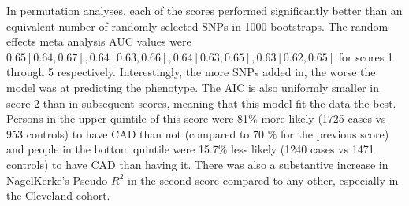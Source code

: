 In permutation analyses, each of the scores performed significantly better than an equivalent number of randomly selected \acp{SNP} in 1000 bootstraps. The random effects meta analysis \ac{AUC} values were $0.65 [ 0.64, 0.67], 0.64[0.63, 0.66], 0.64[0.63, 0.65], 0.63[0.62, 0.65]$ for scores 1 through 5 respectively. Interestingly, the more \acp{SNP} added in, the worse the model was at predicting the phenotype. The \ac{AIC} is also uniformly smaller in score 2 than in subsequent scores, meaning that this model fit the data the best. Persons in the upper quintile of this score were 81\% more likely (1725 cases vs 953 controls) to have \ac{CAD} than not (compared to 70 \% for the previous score) and people in the bottom quintile were 15.7\% less likely (1240 cases vs 1471 controls) to have \ac{CAD} than having it. There was also a substantive increase in NagelKerke's Pseudo $R^2$ in the second score compared to any other, especially in the Cleveland cohort. 